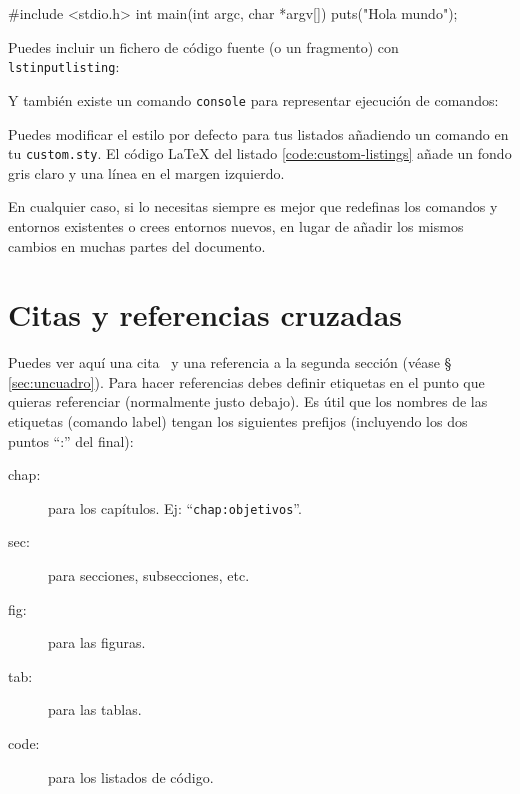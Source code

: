 \begin{listing}[
  float=ht,
  language = C,
  caption  = {«Hola mundo» en C},
  label    = code:hello]
#include <stdio.h>
int main(int argc, char *argv[]) {
    puts("Hola mundo\n");
}
\end{listing}

\noindent
Puedes incluir un fichero de código fuente (o un fragmento) con \texttt{lstinputlisting}:



\noindent
Y también existe un comando \texttt{console} para representar ejecución de
comandos:


Puedes modificar el estilo por defecto para tus listados añadiendo un comando
 en tu \texttt{custom.sty}. El código \LaTeX{} del listado
\ref{code:custom-listings} añade un fondo gris claro y una línea en el margen
izquierdo.

\begin{listing}[
  float=h!,
  caption  = {Personalizando los listados de código},
  label    = code:custom-listings]
\end{listing}

En cualquier caso, si lo necesitas siempre es mejor que redefinas los comandos y entornos
existentes o crees entornos nuevos, en lugar de añadir los mismos cambios en
muchas partes del documento.



\section{Citas y referencias cruzadas}

Puedes ver aquí una cita~\cite{design_patterns} y una referencia a la segunda sección
(véase \S\,\ref{sec:uncuadro}). Para hacer referencias debes definir etiquetas en el punto
que quieras referenciar (normalmente justo debajo). Es útil que los nombres de las
etiquetas (comando label) tengan los siguientes prefijos (incluyendo los dos puntos ``:''
del final):

\begin{description}
\item[chap:] para los capítulos. Ej: ``\texttt{chap:objetivos}''.
\item[sec:] para secciones, subsecciones, etc.
\item[fig:] para las figuras.
\item[tab:] para las tablas.
\item[code:] para los listados de código.
\end{description}

